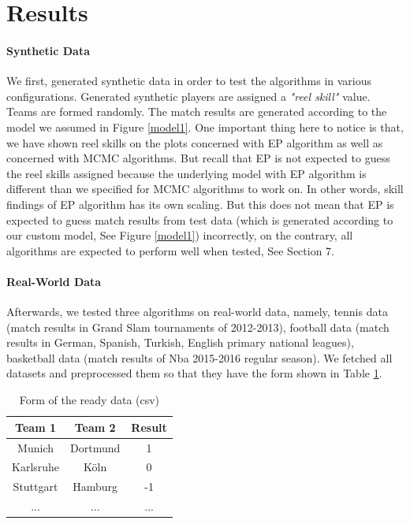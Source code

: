 \documentclass[12pt]{article}
\begin{document}
\section{Results}
\paragraph{Synthetic Data}
We first, generated synthetic data in order to test the algorithms in various configurations. Generated synthetic players are assigned a \textit{"reel skill"} value. Teams are formed randomly. The match results are generated according to the model we assumed in Figure \ref{model1}. One important thing here to notice is that, we have shown reel skills on the plots concerned with EP algorithm as well as concerned with MCMC algorithms. But recall that EP is not expected to guess the reel skills assigned because the underlying model with EP algorithm is different than we specified for MCMC algorithms to work on. In other words, skill findings of EP algorithm has its own scaling. But this does not mean that EP is expected to guess match results from test data (which is generated according to our custom model, See Figure \ref{model1}) incorrectly, on the contrary, all algorithms are expected to perform well when tested, See Section 7.
\paragraph{Real-World Data}
Afterwards, we tested three algorithms on real-world data, namely, tennis data (match results in Grand Slam tournaments of 2012-2013), football data (match results in German, Spanish, Turkish, English primary national leagues), basketball data (match results of Nba 2015-2016 regular season). We fetched all datasets and preprocessed them so that they have the form shown in Table \ref{data_form}.

\begin{table}[!ht]
	\centering
	
	\begin{tabular}{@{}ccc@{}}
		\toprule
		\textbf{Team 1} & \textbf{Team 2} & \textbf{Result} \\ \midrule
		Munich          & Dortmund        & 1               \\
		Karlsruhe       & Köln            & 0               \\
		Stuttgart       & Hamburg         & -1              \\
		...             & ...             & ...             \\ \bottomrule
	\end{tabular}
	\caption{Form of the ready data (csv)}
	\label{data_form}
\end{table}
\end{document}
